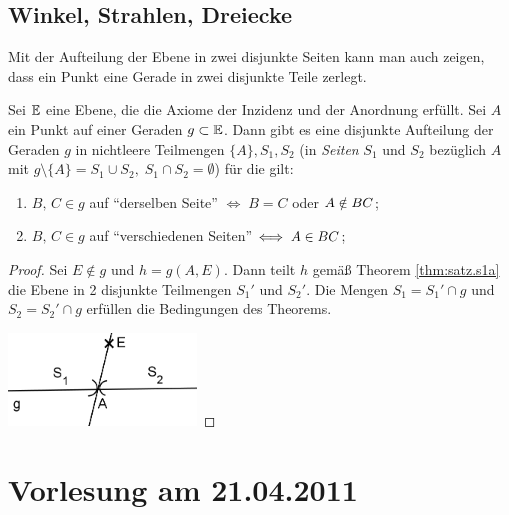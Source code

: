 
\subsection*{Winkel, Strahlen, Dreiecke}

Mit der Aufteilung der Ebene in zwei disjunkte Seiten kann man auch zeigen, dass ein Punkt eine
Gerade in zwei disjunkte Teile zerlegt.

\begin{thm}\label{thm:satz.s1b}
    Sei $\mathbb E$ eine Ebene, die die Axiome der Inzidenz und der Anordnung erfüllt. Sei $A$ ein Punkt
    auf einer Geraden $g \subset \mathbb E$. Dann gibt es eine disjunkte Aufteilung der Geraden $g$ in
    nichtleere Teilmengen $\{A\}, S_1, S_2$ (in {\em Seiten} $S_1$ und $S_2$ bezüglich $A$ mit $g
    \setminus \{A\} = S_1 \cup S_2,\; S_1 \cap S_2 = \emptyset$) für die gilt:
    \renewcommand{\labelenumi}{\alph{enumi})} %
    \begin{enumerate}
        \item $B,\, C \in g$ auf "`derselben Seite"' $\Longleftrightarrow\; B = C$ oder $A \notin
            {BC}$;

        \item $B,\, C \in g$ auf "`verschiedenen Seiten"' $\Longleftrightarrow\; A \in {BC}$;
    \end{enumerate}
\end{thm}

\begin{proof}
    Sei $E \notin g$ und $h = g(A,E)$. Dann teilt $h$ gemäß Theorem \ref{thm:satz.s1a} die Ebene in
    2 disjunkte Teilmengen $S_1'$ und $S_2'$. Die Mengen $S_1 = S_1'\cap g$ und $S_2 = S_2' \cap g$
    erfüllen die Bedingungen des Theorems.

    \centerline{\includegraphics[width=5cm]{BILDER/1-1-07-Satz.png}}
\end{proof}

\section*{Vorlesung am 21.04.2011}

